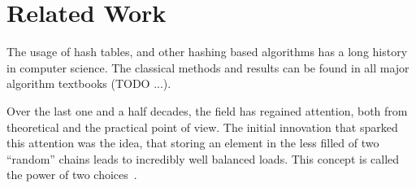 \documentclass[a4paper,UKenglish]{lipics-v2016}
\begin{document}



\section{Related Work}
The usage of hash tables, and other hashing based algorithms has a
long history in computer science.  The classical methods and results
can be found in all major algorithm textbooks (TODO ...).

Over the last one and a half decades, the field has regained
attention, both from theoretical and the practical point of view.  The
initial innovation that sparked this attention was the idea, that
storing an element in the less filled of two ``random'' chains leads to
incredibly well balanced loads.  This concept is called the power of
two choices~\cite{ThePowerOfTwoChoicesInRandomizedLoadBalancing}.
\end{document}
